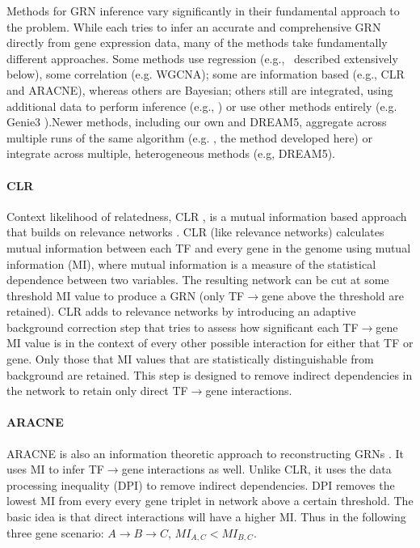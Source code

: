 Methods for GRN inference vary significantly in their fundamental approach to the problem. While each tries to infer an accurate and comprehensive GRN directly from gene expression data, many of the methods take fundamentally different approaches. Some methods use regression (e.g., \nwinf\ described extensively below), some correlation (e.g. WGCNA); some are information based (e.g., CLR and ARACNE), whereas others are Bayesian; others still are integrated, using additional data to perform inference (e.g., \cm) or use other methods entirely (e.g. Genie3 \cite{huynh-thu_inferring_2010}).Newer methods, including our own and DREAM5, aggregate across multiple runs of the same algorithm (e.g. \egrine, the method developed here) or integrate across multiple, heterogeneous methods (e.g, DREAM5).

\paragraph{CLR} Context likelihood of relatedness, CLR \cite{faith_large-scale_2007}, is a mutual information based approach that builds on relevance networks \cite{eisen_cluster_1998,butte_mutual_2000}. CLR (like relevance networks) calculates mutual information between each TF and every gene in the genome using mutual information (MI), where mutual information is a measure of the statistical dependence between two variables. The resulting network can be cut at some threshold MI value to produce a GRN (only TF$\rightarrow$gene above the threshold are retained). CLR adds to relevance networks by introducing an adaptive background correction step that tries to assess how significant each TF$\rightarrow$gene MI value is in the context of every other possible interaction for either that TF or gene. Only those that MI values that are statistically distinguishable from background are retained.  This step is designed to remove indirect dependencies in the network to retain only direct TF$\rightarrow$gene interactions. 

\paragraph{ARACNE} ARACNE is also an information theoretic approach to reconstructing GRNs \cite{margolin_aracne:_2006}. It uses MI to infer TF$\rightarrow$gene interactions as well. Unlike CLR, it uses the data processing inequality (DPI) to remove indirect dependencies. DPI removes the lowest MI from every every gene triplet in network above a certain threshold. The basic idea is that direct interactions will have a higher MI. Thus in the following three gene scenario: $A \rightarrow B \rightarrow C$, $MI_{A,C} < MI_{B,C}$.

